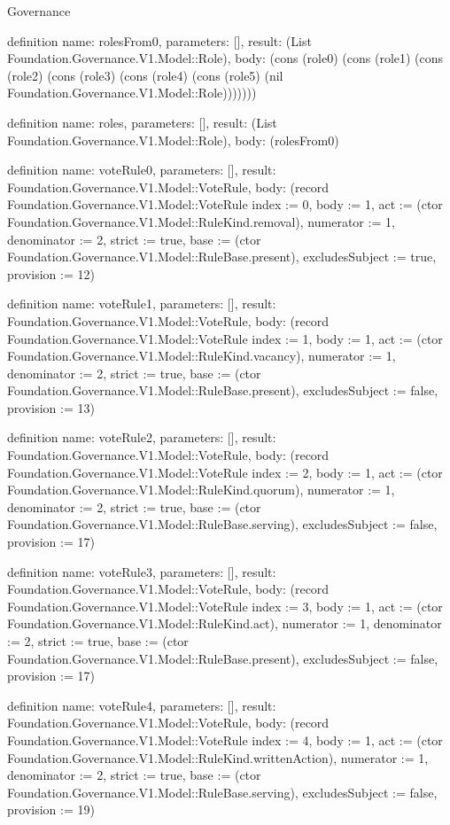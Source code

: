 \begin{lexlean}{Governance}
\begin{semanticmodule}
definition{
  name: rolesFrom0,
  parameters: [],
  result: (List Foundation.Governance.V1.Model::Role),
  body: (cons (role0) (cons (role1) (cons (role2) (cons (role3) (cons (role4) (cons (role5) (nil Foundation.Governance.V1.Model::Role)))))))
}

definition{
  name: roles,
  parameters: [],
  result: (List Foundation.Governance.V1.Model::Role),
  body: (rolesFrom0)
}

definition{
  name: voteRule0,
  parameters: [],
  result: Foundation.Governance.V1.Model::VoteRule,
  body: (record Foundation.Governance.V1.Model::VoteRule {index := 0, body := 1, act := (ctor Foundation.Governance.V1.Model::RuleKind.removal), numerator := 1, denominator := 2, strict := true, base := (ctor Foundation.Governance.V1.Model::RuleBase.present), excludesSubject := true, provision := 12})
}

definition{
  name: voteRule1,
  parameters: [],
  result: Foundation.Governance.V1.Model::VoteRule,
  body: (record Foundation.Governance.V1.Model::VoteRule {index := 1, body := 1, act := (ctor Foundation.Governance.V1.Model::RuleKind.vacancy), numerator := 1, denominator := 2, strict := true, base := (ctor Foundation.Governance.V1.Model::RuleBase.present), excludesSubject := false, provision := 13})
}

definition{
  name: voteRule2,
  parameters: [],
  result: Foundation.Governance.V1.Model::VoteRule,
  body: (record Foundation.Governance.V1.Model::VoteRule {index := 2, body := 1, act := (ctor Foundation.Governance.V1.Model::RuleKind.quorum), numerator := 1, denominator := 2, strict := true, base := (ctor Foundation.Governance.V1.Model::RuleBase.serving), excludesSubject := false, provision := 17})
}

definition{
  name: voteRule3,
  parameters: [],
  result: Foundation.Governance.V1.Model::VoteRule,
  body: (record Foundation.Governance.V1.Model::VoteRule {index := 3, body := 1, act := (ctor Foundation.Governance.V1.Model::RuleKind.act), numerator := 1, denominator := 2, strict := true, base := (ctor Foundation.Governance.V1.Model::RuleBase.present), excludesSubject := false, provision := 17})
}

definition{
  name: voteRule4,
  parameters: [],
  result: Foundation.Governance.V1.Model::VoteRule,
  body: (record Foundation.Governance.V1.Model::VoteRule {index := 4, body := 1, act := (ctor Foundation.Governance.V1.Model::RuleKind.writtenAction), numerator := 1, denominator := 2, strict := true, base := (ctor Foundation.Governance.V1.Model::RuleBase.serving), excludesSubject := false, provision := 19})
}


\end{semanticmodule}
\end{lexlean}
